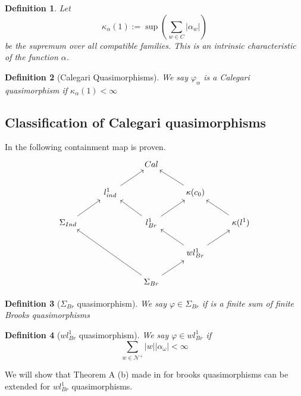 \documentclass[leqno]{article}
\newtheorem*{definition}{Definition}
\begin{document}
\begin{definition} Let
  \[
  \kappa_\alpha (1):= \sup \left( \sum_{w\in C} |\alpha _w| \right) 
  \] 
  be the supremum over all compatible families. This is an intrinsic characteristic of the function $\alpha$.
\end{definition}

\begin{definition}[Calegari Quasimorphisms] We say $\varphi _\alpha $ is a Calegari quasimorphism if $\kappa_{\alpha }(1) < \infty$
\end{definition}

\subsection{Classification of Calegari quasimorphisms}
In \cite{fournier}  the following containment map is proven.
\[\begin{tikzcd}
	&& Cal \\
	& {l^1_{ind}} && {\kappa(c_0)} \\
	{\Sigma_{Ind}} && {l^1_{Br}} && {\kappa(l^1)} \\
	&&& {wl^1_{Br}} \\
	&& {\Sigma_{Br}}
	\arrow[from=5-3, to=3-1]
	\arrow[from=5-3, to=4-4]
	\arrow[from=4-4, to=3-5]
	\arrow[from=4-4, to=3-3]
	\arrow[from=3-5, to=2-4]
	\arrow[from=3-3, to=2-4]
	\arrow[from=2-4, to=1-3]
	\arrow[from=3-1, to=2-2]
	\arrow[from=2-2, to=1-3]
	\arrow[from=3-3, to=2-2]
\end{tikzcd}\]

\begin{definition}[$ \Sigma _{Br}$ quasimorphism] We say  $\varphi \in \Sigma _{Br}$ if is a finite sum of finite Brooks quasimorphisms
\end{definition}

\begin{definition}[$wl^1_{Br}$ quasimorphism] We say  $\varphi \in wl^1_{Br}$ if
  \[
\sum_{w\in \mathcal{N}^+}  |w||\alpha _\omega |<\infty
  \] 
\end{definition}

We will show that Theorem A (b) made in \cite{amontova} for brooks quasimorphisms can be extended for $wl^1_{Br}$ quasimorphisms.
\end{document}
